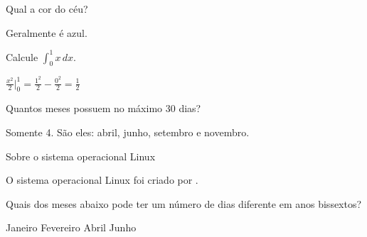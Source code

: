 \documentclass[12pt,addpoints]{exam}
\begin{document}

\begin{questions}


\question[10]
Qual a cor do céu?

\begin{solutionorlines}[2cm]
Geralmente é azul.
\end{solutionorlines}


\question[10]
Calcule $\displaystyle\int_0^1 x \, dx$.

\begin{solutionorbox}[2cm]
$\displaystyle\tfrac{x^2}{2}\Big|^1_0 = \tfrac{1^2}{2} - \tfrac{0^2}{2} = \tfrac{1}{2}$
\end{solutionorbox}

\question[10]
Quantos meses possuem no máximo 30 dias?
\begin{solutionorlines}[2cm]
Somente 4. São eles: abril, junho, setembro e novembro.
\end{solutionorlines}


\question[10]
  Sobre o sistema operacional Linux


\question[20]
O sistema operacional Linux foi criado por .

\clearpage


\question[10]
Quais dos meses abaixo pode ter um número de dias diferente em anos bissextos?
\begin{choices}
	\choice Janeiro
	\correctchoice Fevereiro
	\choice Abril
	\choice Junho
\end{choices}


\end{questions}
\end{document}

